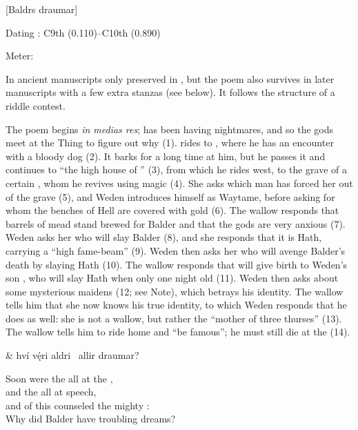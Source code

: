 [Baldrs draumar]

\begin{flushright}%
Dating \parencite{Sapp2022}: C9th (0.110)–C10th (0.890)

Meter: \Fornyrdislag%
\end{flushright}

In ancient manuscripts only preserved in \AM, but the poem also survives in later manuscripts with a few extra stanzas (see below). It follows the structure of a riddle contest.

The poem begins \emph{in medias res};  has been having nightmares, and so the gods meet at the Thing to figure out why (1).  rides to , where he has an encounter with a bloody dog (2). It barks for a long time at him, but he passes it and continues to “the high house of ” (3), from which he rides west, to the grave of a certain , whom he revives using magic (4). She asks which man has forced her out of the grave (5), and Weden introduces himself as Waytame, before asking for whom the benches of Hell are covered with gold (6). The wallow responds that barrels of mead stand brewed for Balder and that the gods are very anxious (7). Weden asks her who will slay Balder (8), and she responds that it is Hath, carrying a “high fame-beam” (9). Weden then asks her who will avenge Balder’s death by slaying Hath (10). The wallow responds that  will give birth to Weden’s son , who will slay Hath when only one night old (11). Weden then asks about some mysterious maidens (12; see Note), which betrays his identity. The wallow tells him that she now knows his true identity, to which Weden responds that he does as well: she is not a wallow, but rather the “mother of three thurses” (13). The wallow tells him to ride home and “be famous”; he must still die at the  (14).

\sectionline

\bvg
\bva{} &
hví vę́ri aldri \hld\ allir draumar?\eva

\bvb Soon were the  all at the , \\
and the  all at speech, \\
and of this counseled the mighty : \\
Why did Balder have troubling dreams?\evb
\evg


